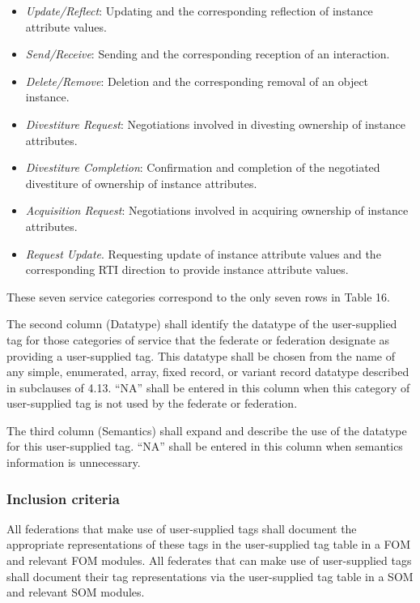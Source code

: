 \newpage
\begin{itemize}[topsep=0pt,itemsep=2pt]
\item \textit{Update/Reflect}: Updating and the corresponding reflection of instance attribute values.
\item \textit{Send/Receive}: Sending and the corresponding reception of an interaction.
\item \textit{Delete/Remove}: Deletion and the corresponding removal of an object instance.
\item \textit{Divestiture Request}: Negotiations involved in divesting ownership of instance attributes.
\item \textit{Divestiture Completion}: Confirmation and completion of the negotiated divestiture of ownership of instance attributes.
\item \textit{Acquisition Request}: Negotiations involved in acquiring ownership of instance attributes.
\item \textit{Request Update}. Requesting update of instance attribute values and the corresponding RTI direction to provide instance attribute values.
\end{itemize}

These seven service categories correspond to the only seven rows in Table 16.

The second column (Datatype) shall identify the datatype of the user-supplied tag for those categories of service that the federate or federation designate as providing a user-supplied tag. This datatype shall be chosen from the name of any simple, enumerated, array, fixed record, or variant record datatype described in subclauses of 4.13. ``NA'' shall be entered in this column when this category of user-supplied tag is not used by the federate or federation.

The third column (Semantics) shall expand and describe the use of the datatype for this user-supplied tag. ``NA'' shall be entered in this column when semantics information is unnecessary.

\vspace{14pt}

\subsubsection{Inclusion criteria}
All federations that make use of user-supplied tags shall document the appropriate representations of these tags in the user-supplied tag table in a FOM and relevant FOM modules. All federates that can make use of user-supplied tags shall document their tag representations via the user-supplied tag table in a SOM and relevant SOM modules.

